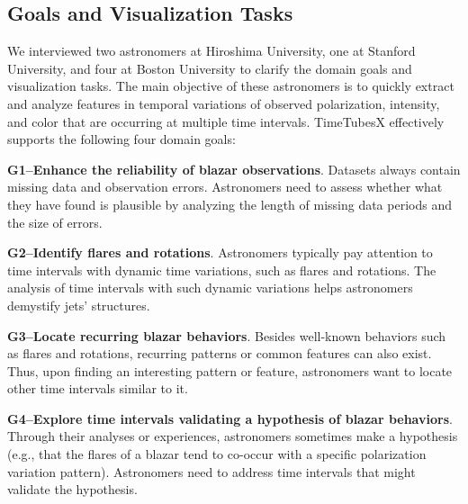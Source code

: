 \subsection{Goals and Visualization Tasks}\label{sec:domainGoalsandTasks}
We interviewed two astronomers at Hiroshima University, one at Stanford University, and four at Boston University to clarify the domain goals and visualization tasks.
The main objective of these astronomers is 
to quickly extract and analyze features in temporal variations of observed polarization, intensity, and color that are occurring at multiple time intervals. 
TimeTubesX effectively supports the following four domain goals:

\noindent\textbf{G1--Enhance the reliability of blazar observations}. 
Datasets always contain missing data and observation errors. 
Astronomers need to assess whether what they have found is plausible by analyzing the length of missing data periods and the size of errors.

\noindent\textbf{G2--Identify flares and rotations}. 
Astronomers typically pay attention to time intervals with dynamic time variations, %
such as flares and rotations.
The analysis of time intervals with such dynamic variations helps astronomers demystify jets' structures.

\noindent\textbf{G3--Locate recurring blazar behaviors}.
Besides well-known behaviors such as flares and rotations, 
recurring patterns or common features can also exist.
Thus, upon finding an interesting pattern or feature, 
astronomers want to locate other time intervals similar to it.

\noindent\textbf{G4--Explore time intervals validating a hypothesis of blazar behaviors}.
Through their analyses or experiences, astronomers sometimes make a hypothesis (e.g., that the flares of a blazar tend to co-occur with a specific polarization variation pattern). 
Astronomers need to address time intervals that might validate the hypothesis.

